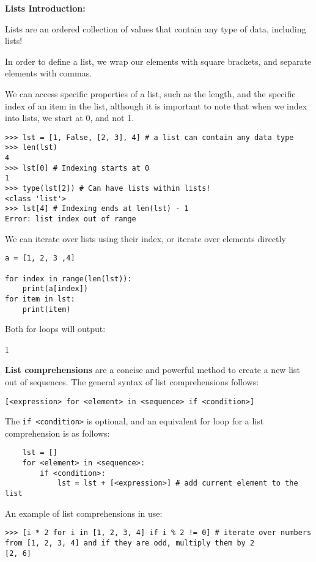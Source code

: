 \textbf{Lists Introduction:}

Lists are an ordered collection of values that contain any type of data, including lists!

In order to define a list, we wrap our elements with square brackets, and separate elements with commas.

We can access specific properties of a list, such as the length, 
and the specific index of an item in the list, although it is important to note that
when we index into lists, we start at 0, and not 1.

\begin{lstlisting}
>>> lst = [1, False, [2, 3], 4] # a list can contain any data type
>>> len(lst)
4
>>> lst[0] # Indexing starts at 0
1
>>> type(lst[2]) # Can have lists within lists!
<class 'list'>
>>> lst[4] # Indexing ends at len(lst) - 1
Error: list index out of range
\end{lstlisting}

We can iterate over lists using their index, or iterate over elements directly

\begin{lstlisting}
a = [1, 2, 3 ,4]

for index in range(len(lst)):
	print(a[index])
for item in lst:
	print(item)
\end{lstlisting}

Both for loops will output:

1 

\textbf{List comprehensions} are a concise and powerful method to create a new list out of sequences. The general syntax of list comprehensions follows:
\begin{lstlisting}
[<expression> for <element> in <sequence> if <condition>]
\end{lstlisting}

The \lstinline{if <condition>} is optional, and an equivalent for loop for a list comprehension is as follows:
\begin{lstlisting}
	lst = []
	for <element> in <sequence>:
		if <condition>:
			lst = lst + [<expression>] # add current element to the list
\end{lstlisting}

An example of list comprehensions in use:

\begin{lstlisting}
>>> [i * 2 for i in [1, 2, 3, 4] if i % 2 != 0] # iterate over numbers from [1, 2, 3, 4] and if they are odd, multiply them by 2
[2, 6]
\end{lstlisting}


